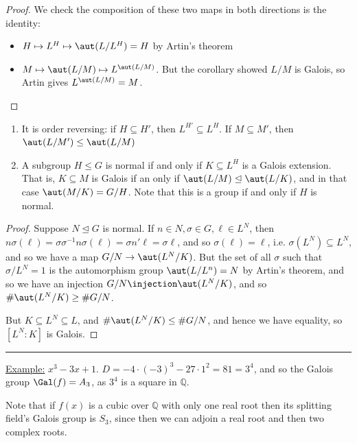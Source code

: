 \documentclass[a4paper, 10pt, twocolumn]{amsart}
\begin{document}
\begin{proof}
We check the composition of these two maps in both directions is the identity:
\begin{itemize}
\item $H \mapsto L^H \mapsto \aut(L/L^H) = H$ by Artin's theorem
\item $M \mapsto \aut(L/M) \mapsto L^{\aut(L/M)}$. But the corollary showed $L/M$ is Galois, so Artin gives $L^{\aut(L/M)} = M$.
\end{itemize}
\end{proof}
\begin{theorem}\item
\begin{enumerate}
\item It is order reversing: if $H \subseteq H'$, then $L^{H'} \subseteq L^H$. If $M\subseteq M'$, then $\aut(L/M') \leq \aut(L/M)$

\item A subgroup $H \leq G$ is normal if and only if $K \subseteq L^H$ is a Galois extension. That is, $K \subseteq M$ is Galois if an only if $\aut(L/M) \trianglelefteq \aut(L/K)$, and in that case $\aut(M/K) = G/H$. Note that this is a group if and only if $H$ is normal.
\end{enumerate}
\end{theorem}
\begin{proof}
Suppose $N \trianglelefteq G$ is normal. If $n \in N, \sigma \in G, \ell \in L^N$, then $n\sigma(\ell) = \sigma \sigma^{-1} n \sigma(\ell) = \sigma n' \ell = \sigma \ell$, and so $\sigma(\ell) = \ell$, i.e. $\sigma(L^N) \subseteq L^N$, and so we have a map $G/N \to \aut(L^N/K)$. But the set of all $\sigma$ such that $\sigma/L^N = 1$ is the automorphism group $\aut(L/L^n) = N$ by Artin's theorem, and so we have an injection $G/N \injection \aut(L^N/K)$, and so $\#\aut(L^N/K) \geq \#G/N$.

But $K \subseteq L^N \subseteq L$, and $\#\aut(L^N/K) \leq \#G/N$, and hence we have equality, so $[L^N:K]$ is Galois.
\end{proof}
\hrule
\underline{Example:} $x^3 - 3x + 1$. $D = -4\cdot (-3)^3 - 27\cdot 1^2 = 81 = 3^4$, and so the Galois group $\Gal(f) = A_3$, as $3^4$ is a square in $\mathbb{Q}$.

Note that if $f(x)$ is a cubic over $\mathbb{Q}$ with only one real root then its splitting field's Galois group is $S_3$, since then we can adjoin a real root and then two complex roots.
\end{document}
